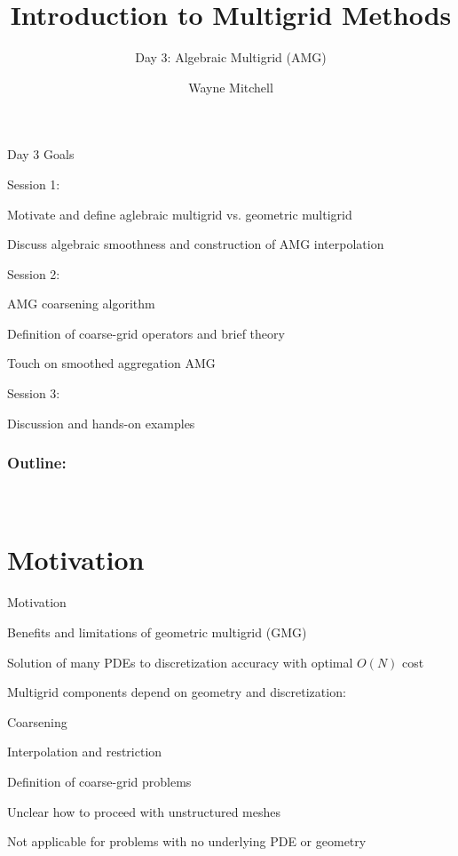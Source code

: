 \documentclass[18pt,xcolor=table]{beamer}
\title[Multigrid]{Introduction to Multigrid Methods}
\subtitle{Day 3: Algebraic Multigrid (AMG)}
\author[Mitchell]{Wayne Mitchell}
\institute{\pgfuseimage{logo}\\Universit\"at Heidelberg\\Institut f\"ur Technische Informatik}
\date[]{\alert{}}
\begin{document}


\DeclareRobustCommand{\Chi}{\raisebox{2pt}{$\chi$}}

\begin{frame}{}
\begin{block}{Day 3 Goals}
\bit
\item Session 1:
\bit
\item Motivate and define aglebraic multigrid vs. geometric multigrid
\item Discuss algebraic smoothness and construction of AMG interpolation
\eit
\item Session 2:
\bit
\item AMG coarsening algorithm
\item Definition of coarse-grid operators and brief theory
\item Touch on smoothed aggregation AMG
\eit
\item Session 3:
\bit
\item Discussion and hands-on examples
\eit
\eit
\end{block}
\end{frame}

\begin{frame}
\frametitle{\bf Outline:}
\framesubtitle{~~}
\tableofcontents
\end{frame}


\section{Motivation}

\begin{frame}{Motivation}
\begin{block}{Benefits and limitations of geometric multigrid (GMG)}
\bit
\item Solution of many PDEs to discretization accuracy with optimal $O(N)$ cost
\item Multigrid components depend on geometry and discretization:
\bit
\item Coarsening
\item Interpolation and restriction
\item Definition of coarse-grid problems
\eit
\item Unclear how to proceed with unstructured meshes
\item Not applicable for problems with no underlying PDE or geometry
\eit
\end{block}
\end{frame}
\end{document}
